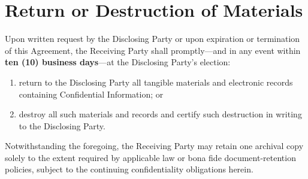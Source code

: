 \section{Return or Destruction of Materials}

\noindent
Upon written request by the Disclosing Party or upon expiration or termination
of this Agreement, the Receiving Party shall promptly—and in any event within
\textbf{ten (10) business days}—at the Disclosing Party's election:

\begin{enumerate}
  \item return to the Disclosing Party all tangible materials and electronic
        records containing Confidential Information; or
  \item destroy all such materials and records and certify such destruction in
        writing to the Disclosing Party.
\end{enumerate}

\noindent
Notwithstanding the foregoing, the Receiving Party may retain one archival copy
solely to the extent required by applicable law or bona fide document-retention
policies, subject to the continuing confidentiality obligations herein.
